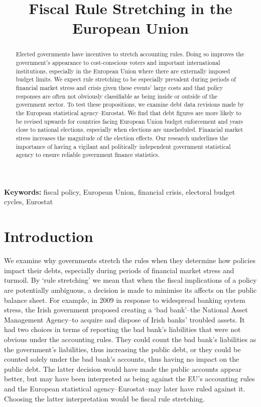 \documentclass[]{article}
\title{Fiscal Rule Stretching in the European Union}
\begin{document}
\maketitle


\begin{abstract}
Elected governments have incentives to stretch accounting rules. Doing so improves the government’s appearance to cost-conscious voters and important international institutions, especially in the European Union where there are externally imposed budget limits. We expect rule stretching to be especially prevalent during periods of financial market stress and crisis given these events' large costs and that policy responses are often not obviously classifiable as being inside or outside of the government sector. To test these propositions, we examine debt data revisions made by the European statistical agency--Eurostat. We find that debt figures are more likely to be revised upwards for countries facing European Union budget enforcement and years close to national elections, especially when elections are unscheduled. Financial market stress increases the magnitude of the election effects. Our research underlines the importance of having a vigilant and politically independent government statistical agency to ensure reliable government finance statistics.
\end{abstract}


\textbf{Keywords:} fiscal policy, European Union, financial crisis, electoral budget cycles, Eurostat

\pagebreak

\section{Introduction}

We examine why governments stretch the rules when they determine how policies impact their debts, especially during periods of financial market stress and turmoil. By `rule stretching' we mean that when the fiscal implications of a policy are potentially ambiguous, a decision is made to minimise its affects on the public balance sheet. For example, in 2009 in response to widespread banking system stress, the Irish government proposed creating a `bad bank'--the National Asset Management Agency--to acquire and dispose of Irish banks' troubled assets. It had two choices in terms of reporting the bad bank's liabilities that were not obvious under the accounting rules. They could count the bad bank's liabilities as the government's liabilities, thus increasing the public debt, or they could be counted solely under the bad bank's accounts, thus having no impact on the public debt. The latter decision would have made the public accounts appear better, but may have been interpreted as being against the EU's accounting rules and the European statistical agency--Eurostat--may later have ruled against it. Choosing the latter interpretation would be fiscal rule stretching.
\end{document}
